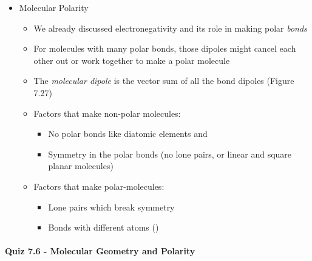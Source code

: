 \documentclass[12pt, openany, letterpaper]{memoir}
\begin{document}
\begin{itemize}
\begin{itemize}
\begin{itemize}
\begin{itemize}
                    \end{itemize}
              \item Octahedral electron geometry
                    \begin{itemize}
                      \item All the positions are equivalent
                      \item The second lone pair will be opposite the first one
                      \item Square planar molecules are symmetrical (this will matter later)
                    \end{itemize}
            \end{itemize}
      \item For larger molecules, you can apply VSEPR to each bonding center (consider )
    \end{itemize}
  \item Molecular Polarity
    \begin{itemize}
      \item We already discussed electronegativity and its role in making polar \emph{bonds}
      \item For molecules with many polar bonds, those dipoles might cancel each other out or work together to make a polar molecule
      \item The \emph{molecular dipole} is the vector sum of all the bond dipoles (Figure 7.27)
      \item Factors that make non-polar molecules:
            \begin{itemize}
              \item No polar bonds like diatomic elements and 
              \item Symmetry in the polar bonds (no lone pairs, or linear and square planar molecules)
            \end{itemize}
      \item Factors that make polar-molecules:
            \begin{itemize}
              \item Lone pairs which break symmetry
              \item Bonds with different atoms ()
            \end{itemize}
    \end{itemize}
\end{itemize}

\paragraph*{Quiz 7.6 - Molecular Geometry and Polarity}
\end{document}
